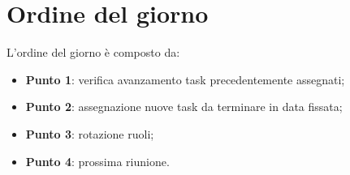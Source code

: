 \section{Ordine del giorno}
L'ordine del giorno è composto da:
\begin{itemize}
	\item \textbf{Punto 1}: verifica avanzamento task precedentemente assegnati;
	\item \textbf{Punto 2}: assegnazione nuove task da terminare in data fissata;
	\item \textbf{Punto 3}: rotazione ruoli;
	\item \textbf{Punto 4}: prossima riunione.
\end{itemize}
